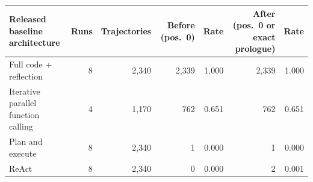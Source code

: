 \begin{tabular}{@{}lrrrrrr@{}}
\toprule
Released baseline architecture & Runs & Trajectories & Before (pos.~0) & Rate & After (pos.~0 or exact prologue) & Rate \\
\midrule
Full code + reflection                 & 8 & 2{,}340 & 2{,}339 & 1.000 & 2{,}339 & 1.000 \\
Iterative parallel function calling    & 4 & 1{,}170 & 762 & 0.651 & 762 & 0.651 \\
Plan and execute                       & 8 & 2{,}340 & 1 & 0.000 & 1 & 0.000 \\
ReAct                                  & 8 & 2{,}340 & 0 & 0.000 & 2 & 0.001 \\
\bottomrule
\end{tabular}
